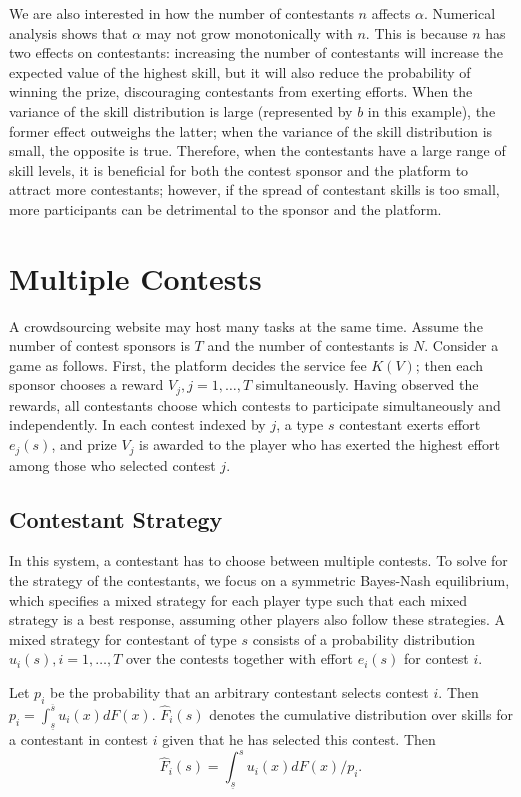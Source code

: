 \documentclass[12pt]{article}
\begin{document}
We are also interested in how the number of contestants $n$ affects $\alpha$. Numerical analysis
shows that $\alpha$ may not grow monotonically with $n$. This is because $n$ has two effects on contestants: increasing
the number of contestants will increase the expected value
of the highest skill, but it will also reduce the probability of winning
the prize, discouraging contestants from exerting efforts. When the variance
of the skill distribution is large (represented by  $b$ in this example), the former effect outweighs the
latter; when the variance of the skill distribution is small,
the opposite is true. Therefore, when the contestants have a large range of skill levels, it is beneficial for both the contest sponsor and the platform to attract more contestants; however,  if the spread
of contestant skills is too small,  more participants can be detrimental to the sponsor and the platform.

\section{Multiple Contests}


A crowdsourcing website may host many tasks at the same time. Assume
the number of contest sponsors is $T$ and the number of contestants
is $N$. Consider a game as follows. First, the platform
decides the service fee $K(V)$; then each sponsor chooses a reward
$V_{j},j=1,\dots,T$ simultaneously. Having observed the rewards,
all contestants choose which contests to participate simultaneously and independently. In each contest
indexed by $j$, a type $s$ contestant exerts effort $e_{j}(s)$, and
prize $V_{j}$ is awarded to the player who has exerted the highest
effort among those who selected contest $j$.

\subsection{Contestant Strategy}
In this system, a contestant has to choose between multiple contests.
To solve for the strategy of the contestants, we focus on a symmetric
Bayes-Nash equilibrium, which specifies a mixed strategy for each
player type such that each mixed strategy is a best response, assuming
other players also follow these strategies. A mixed strategy for contestant
of type $s$ consists of a probability distribution $u_{i}(s),i=1,\dots,T$
over the contests together with effort $e_{i}(s)$ for contest $i$.

Let $p_{i}$ be the probability that an arbitrary contestant selects
contest $i$. Then $p_{i}=\int_{\underline{s}}^{\overline{s}}u_{i}(x)dF(x)$.
$\hat{F}_{i}(s)$ denotes the cumulative distribution over skills
for a contestant in contest $i$ given that he has selected this contest.
Then
\begin{equation}
\hat{F}_{i}(s)=\int_{\underline{s}}^{s}u_{i}(x)dF(x)/p_{i}.\label{eq_u}
\end{equation}
\end{document}
